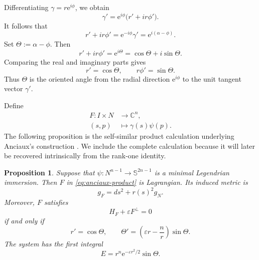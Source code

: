 \documentclass[11pt,a4paper]{article}
\numberwithin{equation}{section}
\newtheorem{proposition}[theorem]{Proposition}
\newcommand{\C}{\mathbb C}
\newcommand{\Sph}{\mathbb S}
\newcommand{\ee}{\mathrm e}
\begin{document}
Differentiating \(\gamma=r\ee^{i\phi}\), we obtain
\[
\gamma'=\ee^{i\phi}\bigl(r'+ir\phi'\bigr).
\]
It follows that
\[
r'+ir\phi'
=\ee^{-i\phi}\gamma'
=\ee^{i(\alpha-\phi)}.
\]
Set \(\Theta:=\alpha-\phi\). Then
\[
r'+ir\phi'
=\ee^{i\Theta}
=\cos\Theta+i\sin\Theta.
\]
Comparing the real and imaginary parts gives
\begin{equation}\label{eq:polar-basic}
r'=\cos\Theta,
\qquad
r\phi'=\sin\Theta.
\end{equation}
Thus \(\Theta\) is the oriented angle from the radial direction
\(\ee^{i\phi}\) to the unit tangent vector \(\gamma'\).

Define
\begin{equation}\label{eq:anciaux-product}
\begin{aligned}
        F:I\times N&\longrightarrow\C^n,\\
        (s,p)&\longmapsto\gamma(s)\psi(p).
\end{aligned}
\end{equation}
The following proposition is the self-similar product calculation underlying Anciaux's construction \cite{Anciaux2006}.  We include the complete calculation because it will later be recovered intrinsically from the rank-one identity.

\begin{proposition}\label{prop:anciaux-product}
Suppose that $\psi:N^{n-1}\to\Sph^{2n-1}$ is a minimal Legendrian immersion.  Then $F$ in \eqref{eq:anciaux-product} is Lagrangian.  Its induced metric is
\begin{equation}\label{eq:product-metric}
        g_F=ds^2+r(s)^2g_N.
\end{equation}
Moreover, $F$ satisfies
$$
        H_F+\varepsilon F^\perp=0
$$
if and only if
\begin{equation}\label{eq:anciaux-system}
        r'=\cos\Theta,
        \qquad
        \Theta'=\left(\varepsilon r-\frac nr\right)\sin\Theta.
\end{equation}
The system has the first integral
\begin{equation}\label{eq:anciaux-first-integral}
        E=r^n\ee^{-\varepsilon r^2/2}\sin\Theta.
\end{equation}
\end{proposition}
\end{document}
